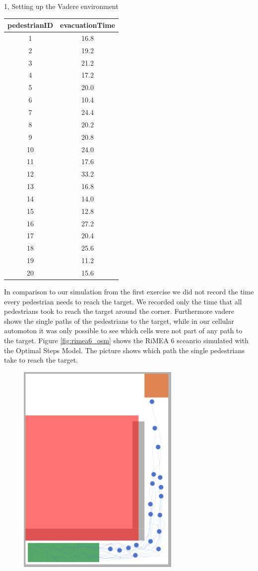 \documentclass[10pt,a4paper]{article}
\begin{document}
\begin{task}{1, Setting up the Vadere environment}
\begin{itemize}
    \bigbreak
    \begin{tabular}{c|c}
    pedestrianID& evacuationTime\\
    \hline
    1& 16.8  \\
    2& 19.2 \\
    3& 21.2\\
    4&17.2\\
    5&20.0\\
    6&10.4\\
    7&24.4\\
    8&20.2\\
    9&20.8\\
    10&24.0\\
    11&17.6\\
    12&33.2\\
    13&16.8\\
    14&14.0\\
    15&12.8\\
    16&27.2\\
    17&20.4\\
    18&25.6\\
    19&11.2\\
    20&15.6\\
    \end{tabular}
    \bigbreak
    In comparison to our simulation from the first exercise we did not record the time every pedestrian needs to reach the target. We recorded only the time that all pedestrians took to reach the target around the corner. Furthermore vadere shows the single paths of the pedestrians to the target, while in our cellular automoton it was only possible to see which cells were not part of any path to the target. Figure \ref{fig:rimea6_osm} shows the RiMEA 6 sceanrio simulated with the Optimal Steps Model. The picture shows which path the single pedestrians take to reach the target.
    \begin{figure}[H]
        \centering
        \includegraphics[width=0.7\textwidth]{pictures/osm/rimeatest6.png}

\end{figure}
\end{itemize}
\end{task}
\end{document}
